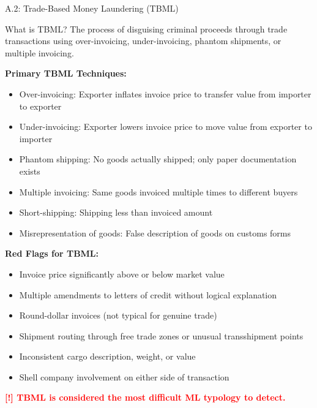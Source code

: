 \documentclass[11pt,a4paper]{beamer}
\newcommand{\redflag}[1]{\textcolor{red}{\textbf{[!] #1}}}
\begin{document}
	\begin{frame}{A.2: Trade-Based Money Laundering (TBML)}
		\begin{block}{What is TBML?}
			The process of disguising criminal proceeds through trade transactions using over-invoicing, under-invoicing, phantom shipments, or multiple invoicing.
		\end{block}
		\textbf{Primary TBML Techniques:}
		\begin{itemize}
			\item Over-invoicing: Exporter inflates invoice price to transfer value from importer to exporter
			\item Under-invoicing: Exporter lowers invoice price to move value from exporter to importer
			\item Phantom shipping: No goods actually shipped; only paper documentation exists
			\item Multiple invoicing: Same goods invoiced multiple times to different buyers
			\item Short-shipping: Shipping less than invoiced amount
			\item Misrepresentation of goods: False description of goods on customs forms
		\end{itemize}
		\textbf{Red Flags for TBML:}
		\begin{itemize}
			\item Invoice price significantly above or below market value
			\item Multiple amendments to letters of credit without logical explanation
			\item Round-dollar invoices (not typical for genuine trade)
			\item Shipment routing through free trade zones or unusual transshipment points
			\item Inconsistent cargo description, weight, or value
			\item Shell company involvement on either side of transaction
		\end{itemize}
		\redflag{TBML is considered the most difficult ML typology to detect.}
	\end{frame}
	
\end{document}
